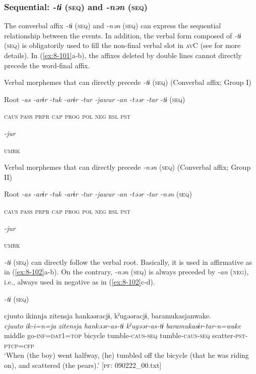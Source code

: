 \subsubsection{Sequential: \textit{-tɨ} (\textsc{seq}) and \textit{-nən} (\textsc{seq})}

The converbal affix \textit{-tɨ} (\textsc{seq}) and \textit{-nən} (\textsc{seq}) can express the sequential relationship between the events. In addition, the verbal form composed of \textit{-tɨ} (\textsc{seq}) is obligatorily used to fill the non-final verbal slot in \textsc{av}C (see  for more details). In (\ref{ex:8-101}a-b), the affixes deleted by double lines cannot directly precede the word-final affix.

\ea\label{ex:8-101}
\ea Verbal morphemes that can directly precede \textit{-tɨ} (\textsc{seq}) (Converbal affix; Group I)

  Root  \textit{-as  -arɨr} %
\textit{-tuk  -arɨr  -tur  -jawur} %
\textit{-an  -təər  -tar  -tɨ} (\textsc{seq})

    \textsc{caus}  \textsc{pass}  \textsc{prpr}  \textsc{cap}  \textsc{prog}  \textsc{pol}  \textsc{neg}  \textsc{rsl}  \textsc{pst}

          \textit{-jur}

          \textsc{umrk}
\z


\ex Verbal morphemes that can directly precede \textit{-nən} (\textsc{seq}) (Converbal affix; Group II)

  Root  \textit{-as  -arɨr} %
\textit{-tuk  -arɨr  -tur  -jawur} %
\textit{-an  -təər  -tar  -nən} (\textsc{seq})

    \textsc{caus}  \textsc{pass}  \textsc{prpr}  \textsc{cap}  \textsc{prog}  \textsc{pol}  \textsc{neg}  \textsc{rsl}  \textsc{pst}

          \textit{-jur}

          \textsc{umrk}
\z

\textit{-tɨ} (\textsc{seq}) can directly follow the verbal root. Basically, it is used in affirmative as in (\ref{ex:8-102}a-b). On the contrary, \textit{-nən} (\textsc{seq}) is always preceded by \textit{-an} (\textsc{neg}), i.e., always used in negative as in (\ref{ex:8-102}c-d).

\ea\label{ex:8-102}
  \textit{-tɨ} (\textsc{seq})

\ea
{\TM}
\glll  cjuuto  ikinnja  {\textbar}zitensja{\textbar}  hankəəracjɨ,      kˀugəəracjɨ,  baramukasjanwake.
\\
\textit{cjuuto}  \textit{ik-i=n=ja}  \textit{zitensja}  \textit{hankəər-as-tɨ}      \textit{kˀugəər-as-tɨ}  \textit{baramukasɨr-tar-n=wake}\\
middle  go-\textsc{inf}=\textsc{dat1}=\textsc{top}  bicycle  tumble-\textsc{caus}-\textsc{seq}  tumble-\textsc{caus}-\textsc{seq}  scatter-\textsc{pst}-\textsc{ptcp}=\textsc{cfp}\\
\glt ‘When (the boy) went halfway, (he) tumbled off the bicycle (that he was riding on), and scattered (the pears).’ [\textsc{pf}: 090222\_00.txt]

